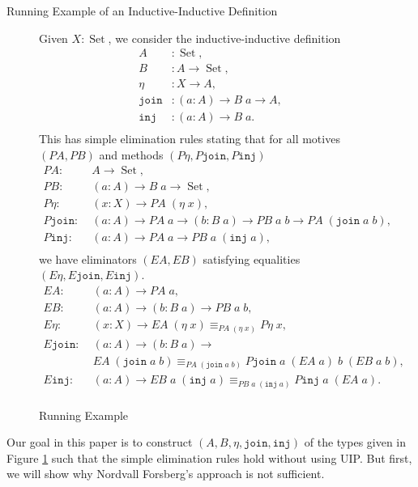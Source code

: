 \documentclass[runningheads]{llncs}
\DeclareMathOperator{\USet}{Set}
\newcommand{\IdA}[3]{{#1}\equiv_{#3}{#2}}
\newcommand{\join}{\texttt{join}}
\newcommand{\inj}{\texttt{inj}}
\def\Forsberg/{Nordvall Forsberg}
\begin{document}
\begin{section}{\label{II-examples}Running Example of an Inductive-Inductive Definition}
\begin{figure}[htpb]
    \begin{flushleft}
        Given $X : \USet$, we consider the inductive-inductive definition\vspace{-.1in}
        \begin{align*}
        A &: \USet,\\
        B &: A \to \USet,\\
        \eta &: X \to A,\\
        \join &: (a : A) \to B\;a \to A,\\
        \inj &: (a : A) \to B\;a.\\[-.3in]
        \end{align*}
        This has simple elimination rules stating that for all motives $(PA, PB)$ and methods $(P\eta, P\join, P\inj)$\vspace{-.1in}
        \begin{align*}
        PA :&\; A \to \USet,\\
        PB :&\; (a : A) \to B\;a\to \USet,\\
        P\eta :&\; (x : X) \to PA\;(\eta\;x),\\
        P\join :&\; (a : A) \to PA\;a\to (b : B\;a) \to PB\;a\;b \to PA\;(\join\;a\;b),\\
        P\inj :&\; (a : A) \to PA\;a\to PB\;a\;(\inj\;a),\\[-.3in]
        \end{align*}
        we have eliminators $(EA, EB)$ satisfying equalities $(E\eta, E\join, E\inj)$.\vspace{-.1in}
        \begin{align*}
        EA :&\; (a : A) \to PA\;a,\\
        EB :&\; (a : A) \to (b : B\;a) \to PB\;a\;b,\\
        E\eta :&\; (x : X) \to \IdA{EA\;(\eta\;x)}{P\eta\;x}{PA\;(\eta\;x)},\\
        E\join :&\; (a : A) \to (b : B\;a) \to\\&\; \IdA{EA\;(\join\;a\;b)}{P\join\;a\;(EA\;a)\;b\;(EB\;a\;b)}{PA\;(\join\;a\;b)},\\
        E\inj :&\; (a : A) \to \IdA{EB\;a\;(\inj\;a)}{P\inj\;a\;(EA\;a)}{PB\;a\;(\inj\;a)}.\\[-.3in]
        \end{align*}
    \end{flushleft}
    
    \caption{\label{example-definition}Running Example}
\end{figure}

Our goal in this paper is to construct $(A,B,\eta,\join,\inj)$ of the types given in Figure \ref{example-definition} such that the simple elimination rules hold without using UIP. But first, we will show why \Forsberg/'s approach is not sufficient.



\end{section}
\end{document}
